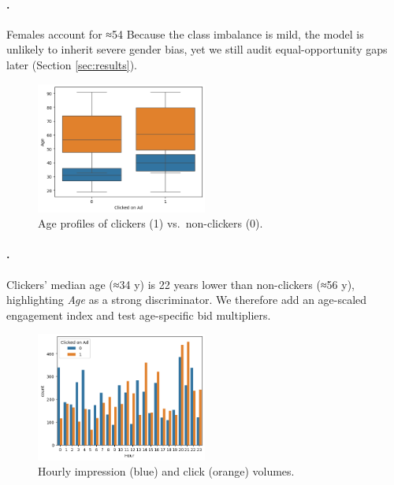 \documentclass[12pt,a4paper]{article}
\begin{document}
\paragraph{.}
Females account for ≈54 %
Because the class imbalance is mild, the model is unlikely to inherit
severe gender bias, yet we still audit equal-opportunity gaps later
(Section \ref{sec:results}).

\begin{figure}[H]
  \centering
  \includegraphics[width=0.5\textwidth]{output3.png}
  \caption{Age profiles of clickers (1) vs.\ non-clickers (0).}
  \label{fig:age_click}
\end{figure}

\paragraph{.}
Clickers’ median age (≈34 y) is 22 years lower than non-clickers (≈56 y),
highlighting \emph{Age} as a strong discriminator.  We therefore add an
age-scaled engagement index and test age-specific bid multipliers.

\begin{figure}[H]
  \centering
  \includegraphics[width=0.5\textwidth]{output4.png}
  \caption{Hourly impression (blue) and click (orange) volumes.}
  \label{fig:hour}
\end{figure}
\end{document}
